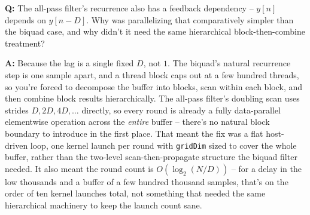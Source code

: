 \documentclass[11pt]{article}
\newcommand{\Q}[1]{\vspace{0.6em}\noindent\textbf{\textcolor{blue!60!black}{Q:}} #1\par}
\newcommand{\A}[1]{\noindent\textbf{A:} #1\par}
\begin{document}
\Q{The all-pass filter's recurrence also has a feedback dependency -- $y[n]$ depends on $y[n-D]$. Why was parallelizing that comparatively simpler than the biquad case, and why didn't it need the same hierarchical block-then-combine treatment?}
\A{Because the lag is a single fixed $D$, not $1$. The biquad's natural recurrence step is one sample apart, and a thread block caps out at a few hundred threads, so you're forced to decompose the buffer into blocks, scan within each block, and then combine block results hierarchically. The all-pass filter's doubling scan uses strides $D, 2D, 4D, \dots$ directly, so every round is already a fully data-parallel elementwise operation across the \emph{entire} buffer -- there's no natural block boundary to introduce in the first place. That meant the fix was a flat host-driven loop, one kernel launch per round with \texttt{gridDim} sized to cover the whole buffer, rather than the two-level scan-then-propagate structure the biquad filter needed. It also meant the round count is $O(\log_2(N/D))$ -- for a delay in the low thousands and a buffer of a few hundred thousand samples, that's on the order of ten kernel launches total, not something that needed the same hierarchical machinery to keep the launch count sane.}
\end{document}
